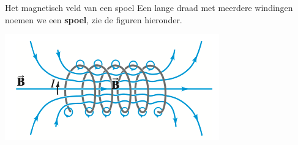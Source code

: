 \begin{theo}{Het magnetisch veld van een spoel}
    Een lange draad met meerdere windingen noemen we een \textbf{spoel}, zie de figuren hieronder.


        \begin{center}
            \includegraphics[scale = 0.4]{Images/Magnetisme/Spoel}
        \end{center}



\end{theo}
